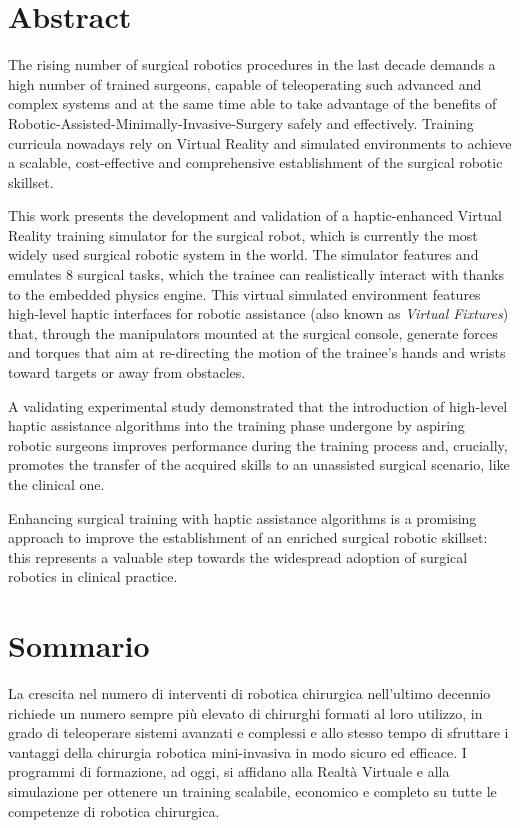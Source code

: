 \documentclass[../main.tex]{subfiles}
\begin{document}
\chapter*{Abstract}
The rising number of surgical robotics procedures in the last decade demands a high number of trained surgeons, capable of teleoperating such advanced and complex systems and at the same time able to take advantage of the benefits of Robotic-Assisted-Minimally-Invasive-Surgery safely and effectively. Training curricula nowadays rely on Virtual Reality and simulated environments to achieve a scalable, cost-effective and comprehensive establishment of the surgical robotic skillset.

This work presents the development and validation of a haptic-enhanced Virtual Reality training simulator for the \davinci surgical robot, which is currently the most widely used surgical robotic system in the world. The simulator features and emulates 8 surgical tasks, which the trainee can realistically interact with thanks to the embedded physics engine. This virtual simulated environment features high-level haptic interfaces for robotic assistance (also known as \textit{Virtual Fixtures}) that, through the manipulators mounted at the surgical console, generate forces and torques that aim at re-directing the motion of the trainee's hands and wrists toward targets or away from obstacles. 

A validating experimental study demonstrated that the introduction of high-level haptic assistance algorithms into the training phase undergone by aspiring robotic surgeons improves performance during the training process and, crucially, promotes the transfer of the acquired skills to an unassisted surgical scenario, like the clinical one. 

Enhancing surgical training with haptic assistance algorithms is a promising approach to improve the establishment of an enriched surgical robotic skillset: this represents a valuable step towards the widespread adoption of surgical robotics in clinical practice.


\newpage\newpage
{}
\chapter*{Sommario}
La crescita nel numero di interventi di robotica chirurgica nell'ultimo decennio richiede un numero sempre più elevato di chirurghi formati al loro utilizzo, in grado di teleoperare sistemi avanzati e complessi e allo stesso tempo di sfruttare i vantaggi della chirurgia robotica mini-invasiva in modo sicuro ed efficace. I programmi di formazione, ad oggi, si affidano alla Realtà Virtuale e alla simulazione per ottenere un training scalabile, economico e completo su tutte le competenze di robotica chirurgica.
\end{document}
